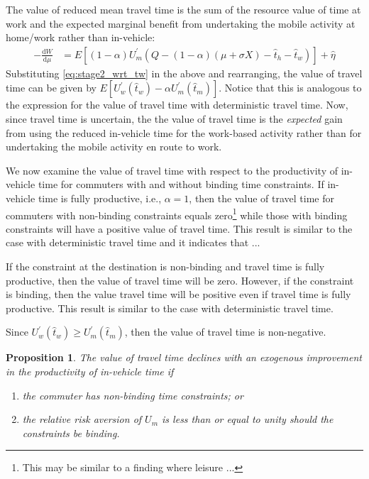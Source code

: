 \documentclass[12pt,a4paper,british]{article}
\newtheorem{prop}{Proposition}[section]
\begin{document}
The value of reduced mean travel time is the sum of the resource value of time at work and the expected marginal benefit from undertaking the mobile activity at home/work rather than in-vehicle:
\begin{align}
-\frac{\mathrm{d}W}{\mathrm{d}\mu} & = E\left[ \left( 1 - \alpha\right) U_m^{\prime} \left(  Q - \left(1 - \alpha \right) \left( \mu + \sigma X \right) - \hat{t}_{h} - \hat{t}_{w} \right) \right] + \hat{\eta} 
\label{eq:VOT_stochastic}
\end{align}
Substituting \eqref{eq:stage2_wrt_tw} in the above and rearranging, the value of travel time can be given by $E\left[ U_{w}^{\prime}\left( \hat{t}_{w} \right) - \alpha U_{m}^{\prime}\left( \hat{t}_{m} \right)\right]$.  Notice that this is analogous to the expression for the value of travel time with deterministic travel time. Now, since travel time is uncertain, the the value of travel time is the \textit{expected} gain from using the reduced in-vehicle time for the work-based activity rather than for undertaking the mobile activity en route to work. 

We now examine the value of travel time with respect to the productivity of in-vehicle time for commuters with and without binding time constraints. If in-vehicle time is fully productive, i.e., $\alpha=1$,  then the value of travel time for commuters with non-binding constraints equals zero\footnote{This may be similar to a finding where leisure ... } while those with binding constraints will have a positive value of travel time. This result is similar to the case with deterministic travel time and it indicates that ... 

If the constraint at the destination is non-binding and travel time is fully productive, then the value of travel time will be zero. However, if the constraint is binding, then the value travel time will be positive even if travel time is fully productive. This result is similar to the case with deterministic travel time.

Since $U_{w}^{\prime}\left(\hat{t}_{w}\right) \geq U_{m}^{\prime} \left( \hat{t}_{m} \right)$, then the value of travel time is non-negative. 

\begin{prop}
The value of travel time declines with an exogenous improvement in the productivity of in-vehicle time if 
\begin{enumerate}
\item the commuter has non-binding time constraints; or 
\item the relative risk aversion of $U_m$ is less than or equal to unity should the constraints be binding. 
\end{enumerate}
\end{prop}
\end{document}
